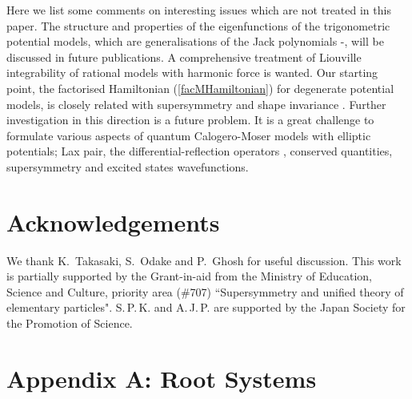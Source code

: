 \documentclass[a4paper,12pt]{article}
\begin{document}
Here we list some comments on interesting issues which are not treated in
this paper.
The structure and properties of the eigenfunctions of the trigonometric
potential models, which are generalisations of the Jack polynomials
\cite{Stan}-\cite{Awat}, will be discussed in future publications.
A comprehensive treatment of Liouville integrability of
rational models with harmonic force is wanted.
Our starting point, the factorised Hamiltonian (\ref{facMHamiltonian})
for degenerate potential models, is closely related with supersymmetry
and shape invariance \cite{Eft,Kha}. Further investigation in this
direction is a future problem.
It is a great challenge to formulate various aspects of
quantum Calogero-Moser models with elliptic potentials;
Lax pair, the differential-reflection operators \cite{Cher,Oshima},
conserved quantities, supersymmetry and excited states wavefunctions.

\section*{Acknowledgements}
\setcounter{equation}{0}
We thank K.\, Takasaki, S.\, Odake and P.\, Ghosh for useful discussion.
This work is partially supported  by the Grant-in-aid from
the   Ministry of Education, Science and Culture,
priority area (\#707)  ``Supersymmetry and unified theory of elementary
particles". S.\,P.\,K. and A.\,J.\,P. are supported by the
Japan Society for the
Promotion of Science.
\section*{Appendix A: Root Systems}
\setcounter{equation}{0}

\renewcommand{\theequation}{A.\arabic{equation}}
\end{document}
